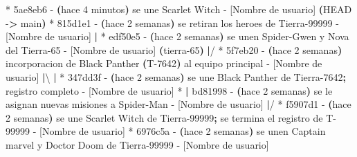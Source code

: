\documentclass[
]{book}
\newenvironment{Shaded}{\begin{snugshade}}{\end{snugshade}}
\newcommand{\AttributeTok}[1]{\textcolor[rgb]{0.13,0.29,0.53}{#1}}
\newcommand{\ErrorTok}[1]{\textcolor[rgb]{0.64,0.00,0.00}{\textbf{#1}}}
\newcommand{\ExtensionTok}[1]{#1}
\newcommand{\KeywordTok}[1]{\textcolor[rgb]{0.13,0.29,0.53}{\textbf{#1}}}
\newcommand{\NormalTok}[1]{#1}
\newcommand{\OperatorTok}[1]{\textcolor[rgb]{0.81,0.36,0.00}{\textbf{#1}}}
\begin{document}
\begin{Shaded}
\begin{Highlighting}[]
\ExtensionTok{*}\NormalTok{ 5ae8eb6 }\AttributeTok{{-}} \ErrorTok{(}\ExtensionTok{hace}\NormalTok{ 4 minutos}\KeywordTok{)} \ExtensionTok{se}\NormalTok{ une Scarlet Witch }\AttributeTok{{-}}\NormalTok{ [Nombre de usuario] }\ErrorTok{(}\ExtensionTok{HEAD} \AttributeTok{{-}}\OperatorTok{\textgreater{}}\NormalTok{ main}\KeywordTok{)}
\ExtensionTok{*}\NormalTok{ 815d1e1 }\AttributeTok{{-}} \ErrorTok{(}\ExtensionTok{hace}\NormalTok{ 2 semanas}\KeywordTok{)} \ExtensionTok{se}\NormalTok{ retiran los heroes de Tierra{-}99999 }\AttributeTok{{-}}\NormalTok{ [Nombre de usuario]}
\KeywordTok{|} \ExtensionTok{*}\NormalTok{ edf50e5 }\AttributeTok{{-}} \ErrorTok{(}\ExtensionTok{hace}\NormalTok{ 2 semanas}\KeywordTok{)} \ExtensionTok{se}\NormalTok{ unen Spider{-}Gwen y Nova del Tierra{-}65 }\AttributeTok{{-}}\NormalTok{ [Nombre de usuario] }\ErrorTok{(}\ExtensionTok{tierra{-}65}\KeywordTok{)}
\KeywordTok{|}\ExtensionTok{/}  
\ExtensionTok{*}\NormalTok{   5f7eb20 }\AttributeTok{{-}} \ErrorTok{(}\ExtensionTok{hace}\NormalTok{ 2 semanas}\KeywordTok{)} \ExtensionTok{incorporacion}\NormalTok{ de Black Panther }\ErrorTok{(}\ExtensionTok{T{-}7642}\KeywordTok{)} \ExtensionTok{al}\NormalTok{ equipo principal }\AttributeTok{{-}}\NormalTok{ [Nombre de usuario]}
\KeywordTok{|}\ExtensionTok{\textbackslash{} } 
\KeywordTok{|} \ExtensionTok{*}\NormalTok{ 347dd3f }\AttributeTok{{-}} \ErrorTok{(}\ExtensionTok{hace}\NormalTok{ 2 semanas}\KeywordTok{)} \ExtensionTok{se}\NormalTok{ une Black Panther de Tierra{-}7642}\KeywordTok{;} \ExtensionTok{registro}\NormalTok{ completo }\AttributeTok{{-}}\NormalTok{ [Nombre de usuario]}
\ExtensionTok{*} \KeywordTok{|} \ExtensionTok{bd81998} \AttributeTok{{-}} \ErrorTok{(}\ExtensionTok{hace}\NormalTok{ 2 semanas}\KeywordTok{)} \ExtensionTok{se}\NormalTok{ le asignan nuevas misiones a Spider{-}Man }\AttributeTok{{-}}\NormalTok{ [Nombre de usuario]}
\KeywordTok{|}\ExtensionTok{/}  
\ExtensionTok{*}\NormalTok{ f5907d1 }\AttributeTok{{-}} \ErrorTok{(}\ExtensionTok{hace}\NormalTok{ 2 semanas}\KeywordTok{)} \ExtensionTok{se}\NormalTok{ une Scarlet Witch de Tierra{-}99999}\KeywordTok{;} \ExtensionTok{se}\NormalTok{ termina el registro de T{-}99999 }\AttributeTok{{-}}\NormalTok{ [Nombre de usuario]}
\ExtensionTok{*}\NormalTok{ 6976c5a }\AttributeTok{{-}} \ErrorTok{(}\ExtensionTok{hace}\NormalTok{ 2 semanas}\KeywordTok{)} \ExtensionTok{se}\NormalTok{ unen Captain marvel y Doctor Doom de Tierra{-}99999 }\AttributeTok{{-}}\NormalTok{ [Nombre de usuario]}

\end{Highlighting}
\end{Shaded}
\end{document}
